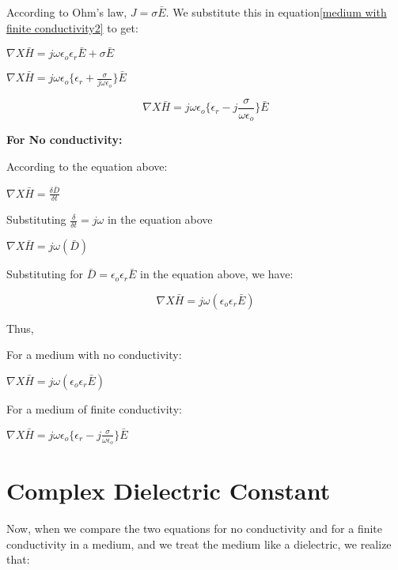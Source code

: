 According to Ohm's law, $J = \sigma\bar{E}$. We substitute this in equation\ref{medium with finite conductivity2} to get:

\begin{center}
$\nabla X \bar{H} = j\omega\epsilon_{o}\epsilon_{r}\bar{E} + \sigma\bar{E}$ 
\end{center}

\begin{center}
$\nabla X \bar{H} = j\omega\epsilon_{o}\{\epsilon_{r} + \frac{\sigma}{j\omega\epsilon_{o}}\}\bar{E}$ 
\end{center}

\begin{equation}
\nabla X \bar{H} = j\omega\epsilon_{o}\Bigg\{\epsilon_{r} -j \frac{\sigma}{\omega\epsilon_{o}}\Bigg\}\bar{E} 
\end{equation}

\textbf{For No conductivity:}

According to the equation above:

\begin{center}
$\nabla X \bar{H} = \frac{\delta \bar {D}}{\delta t}$
\end{center}

Substituting $\frac{\delta}{\delta t} = j\omega$ in the equation above

\begin{center}
$\nabla X \bar{H} = j \omega(\bar{D})$
\end{center}

Substituting for $\bar{D} = \epsilon_{o}\epsilon_{r}\bar{E}$ in the equation above, we have:

\begin{equation}
\nabla X \bar{H} = j \omega(\epsilon_{o}\epsilon_{r}\bar{E})
\end{equation}



Thus,

For a medium with no conductivity:
\begin{center}
$\nabla X \bar{H} = j \omega(\epsilon_{o}\epsilon_{r}\bar{E})$
\end{center}

For a medium of finite conductivity:
\begin{center}
$\nabla X \bar{H} = j\omega\epsilon_{o}\bigg\{\epsilon_{r} -j \frac{\sigma}{\omega\epsilon_{o}}\bigg\}\bar{E}$ 
\end{center}

\section{Complex Dielectric Constant}
Now, when we compare the two equations for no conductivity and for a finite conductivity in a medium, and we treat the medium like a dielectric, we realize that:

